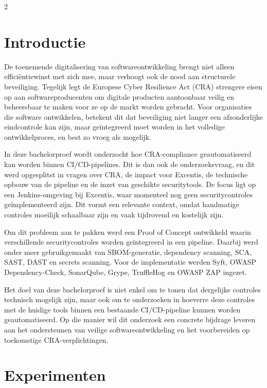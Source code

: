 \documentclass[a0,portrait]{hogent-poster}
\begin{document}
\begin{multicols}{2} %

\section{Introductie}

De toenemende digitalisering van softwareontwikkeling brengt niet alleen efficiëntiewinst met zich mee, maar verhoogt ook de nood aan structurele beveiliging. Tegelijk legt de Europese Cyber Resilience Act (CRA) strengere eisen op aan softwareproducenten om digitale producten aantoonbaar veilig en beheersbaar te maken voor ze op de markt worden gebracht. Voor organisaties die software ontwikkelen, betekent dit dat beveiliging niet langer een afzonderlijke eindcontrole kan zijn, maar geïntegreerd moet worden in het volledige ontwikkelproces, en best zo vroeg als mogelijk.

In deze bachelorproef wordt onderzocht hoe CRA-compliance geautomatiseerd kan worden binnen CI/CD-pipelines.  Dit is dan ook de onderzoeksvraag, en dit werd opgesplitst in vragen over CRA, de impact voor Excentis, de technische opbouw van de pipeline en de inzet van geschikte securitytools. De focus ligt op een Jenkins-omgeving bij Excentis, waar momenteel nog geen securitycontroles geïmplementeerd zijn. Dit vormt een relevante context, omdat handmatige controles moeilijk schaalbaar zijn en vaak tijdrovend en kostelijk zijn.

Om dit probleem aan te pakken werd een Proof of Concept ontwikkeld waarin verschillende securitycontroles worden geïntegreerd in een pipeline. Daarbij werd onder meer gebruikgemaakt van SBOM-generatie, dependency scanning, SCA, SAST, DAST en secrets scanning. Voor de implementatie werden Syft, OWASP Dependency-Check, SonarQube, Grype, TruffleHog en OWASP ZAP ingezet.

Het doel van deze bachelorproef is niet enkel om te tonen dat dergelijke controles technisch mogelijk zijn, maar ook om te onderzoeken in hoeverre deze controles met de huidige tools binnen een bestaande CI/CD-pipeline kunnen worden geautomatiseerd. Op die manier wil dit onderzoek een concrete bijdrage leveren aan het ondersteunen van veilige softwareontwikkeling en het voorbereiden op toekomstige CRA-verplichtingen.

\section{Experimenten}


\end{multicols}
\end{document}

